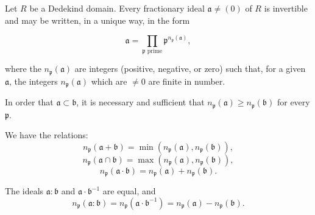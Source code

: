 Let $R$ be a Dedekind domain. Every fractionary ideal $\mathfrak{a} \neq (0)$ of $R$ is invertible and may be written, in a unique way, in the form

$$\mathfrak{a} = \prod_{\mathfrak{p} \text{ prime}} \mathfrak{p}^{n_{\mathfrak{p}}(\mathfrak{a})},$$

where the $n_{\mathfrak{p}}(\mathfrak{a})$ are integers (positive, negative, or zero) such that, for a given $\mathfrak{a}$, the integers $n_{\mathfrak{p}}(\mathfrak{a})$ which are $\neq 0$ are finite in number.

In order that $\mathfrak{a} \subset \mathfrak{b}$, it is necessary and sufficient that $n_{\mathfrak{p}}(\mathfrak{a}) \geq n_{\mathfrak{p}}(\mathfrak{b})$ for every $\mathfrak{p}$.

We have the relations:
$$n_{\mathfrak{p}}(\mathfrak{a} + \mathfrak{b}) = \min(n_{\mathfrak{p}}(\mathfrak{a}), n_{\mathfrak{p}}(\mathfrak{b})),$$
$$n_{\mathfrak{p}}(\mathfrak{a} \cap \mathfrak{b}) = \max(n_{\mathfrak{p}}(\mathfrak{a}), n_{\mathfrak{p}}(\mathfrak{b})),$$
$$n_{\mathfrak{p}}(\mathfrak{a} \cdot \mathfrak{b}) = n_{\mathfrak{p}}(\mathfrak{a}) + n_{\mathfrak{p}}(\mathfrak{b}).$$

The ideals $\mathfrak{a}:\mathfrak{b}$ and $\mathfrak{a} \cdot \mathfrak{b}^{-1}$ are equal, and
$$n_{\mathfrak{p}}(\mathfrak{a}:\mathfrak{b}) = n_{\mathfrak{p}}(\mathfrak{a} \cdot \mathfrak{b}^{-1}) = n_{\mathfrak{p}}(\mathfrak{a}) - n_{\mathfrak{p}}(\mathfrak{b}).$$
